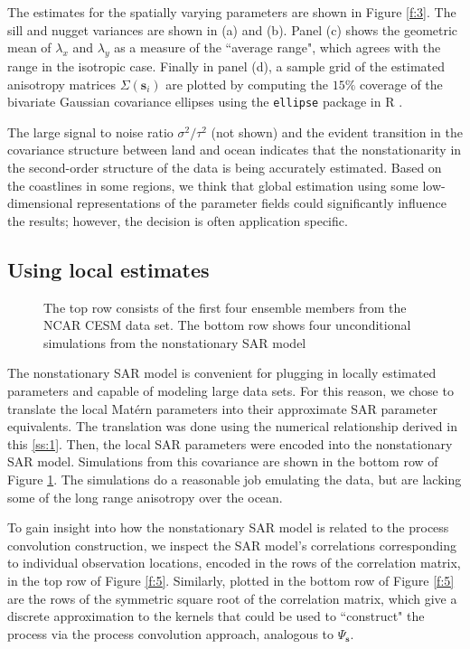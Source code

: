 \documentclass[review]{elsarticle}
\begin{document}
The estimates for the spatially varying parameters are shown in Figure \ref{f:3}. The sill and nugget variances are shown in (a) and (b). Panel (c) shows the geometric mean of $\lambda_x$ and $\lambda_y$ as a measure of the ``average range", which agrees with the range in the isotropic case. Finally in panel (d), a sample grid of the estimated anisotropy matrices $\Sigma(\mathbf s_i)$ are plotted by computing the $15\%$ coverage of the bivariate Gaussian covariance ellipses using the \texttt{ellipse} package in R \cite{ellipse}.

The large signal to noise ratio $\sigma^2/\tau^2$ (not shown) and the evident transition in the covariance structure between land and ocean indicates that the nonstationarity in the second-order structure of the data is being accurately estimated. Based on the coastlines in some regions, we think that global estimation using some low-dimensional representations of the parameter fields could significantly influence the results; however, the decision is often application specific.



\subsection{Using local estimates}

\begin{figure}
    \centering
    \caption{The top row consists of the first four ensemble members from the NCAR CESM data set. The bottom row shows four unconditional simulations from the nonstationary SAR model}
    \label{f:4}
\end{figure}


The nonstationary SAR model is convenient for plugging in locally estimated parameters and capable of modeling large data sets. For this reason, we chose to translate the local Mat\'ern parameters into their approximate SAR parameter equivalents. The translation was done using the numerical relationship derived in this \ref{ss:1}. Then, the local SAR parameters were encoded into the nonstationary SAR model. Simulations from this covariance are shown in the bottom row of Figure \ref{f:4}. The simulations do a reasonable job emulating the data, but are lacking some of the long range anisotropy over the ocean.

To gain insight into how the nonstationary SAR model is related to the process convolution construction, we inspect the SAR model's correlations corresponding to individual observation locations, encoded in the rows of the correlation matrix, in the top row of Figure \ref{f:5}. Similarly, plotted in the bottom row of Figure \ref{f:5} are the rows of the symmetric square root of the correlation matrix, which give a discrete approximation to the kernels that could be used to ``construct" the process via the process convolution approach, analogous to $ \Psi_{\mathbf{s}}$. 
\end{document}

